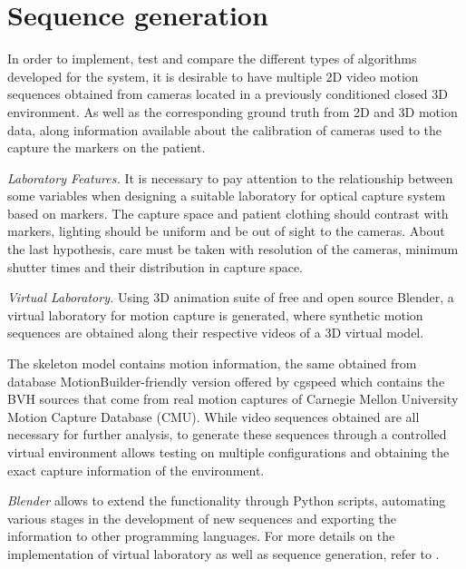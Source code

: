 \section{Sequence generation} 
\label{section_base_de_datos}
In order to implement, test and compare the different types of algorithms developed for the system, it is desirable to have multiple 2D video motion sequences obtained from cameras located in a previously conditioned closed 3D environment. As well as the corresponding ground truth from 2D and 3D motion data, along information available about the calibration of cameras used to the capture the markers on the patient.

\textit{Laboratory Features.}
\label{seccion_Caracteristicas_Laboratorio}
It is necessary to pay attention to the relationship between some variables when designing a suitable laboratory for optical capture system based on markers. The capture space and patient clothing should contrast with markers, lighting should be uniform and be out of sight to the cameras. About the last hypothesis, care must be taken with resolution of the cameras, minimum shutter times and their distribution in capture space.

\textit{Virtual Laboratory.} Using 3D animation suite of free and open source Blender, a virtual laboratory for motion capture is generated, where synthetic motion sequences are obtained along their respective videos of a 3D virtual model.

The skeleton model contains motion information, the same obtained from database MotionBuilder-friendly version offered by cgspeed which contains the BVH sources that come from real motion captures of Carnegie Mellon University Motion Capture Database (CMU). While video sequences obtained are all necessary for further analysis, to generate these sequences through a controlled virtual environment allows testing on multiple configurations and obtaining the exact capture information of the environment.

\emph{Blender} allows to extend the functionality through Python scripts, automating various stages in the development of new sequences and exporting the information to other programming languages.
For more details on the implementation of virtual laboratory as well as sequence generation, refer to \cite{proyecto_biomecanica}.
